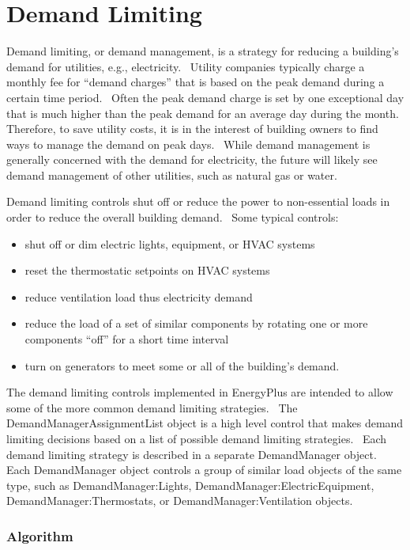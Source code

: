 \chapter{Demand Limiting}\label{demand-limiting}

Demand limiting, or demand management, is a strategy for reducing a building's demand for utilities, e.g., electricity.~ Utility companies typically charge a monthly fee for ``demand charges'' that is based on the peak demand during a certain time period.~ Often the peak demand charge is set by one exceptional day that is much higher than the peak demand for an average day during the month.~ Therefore, to save utility costs, it is in the interest of building owners to find ways to manage the demand on peak days.~ While demand management is generally concerned with the demand for electricity, the future will likely see demand management of other utilities, such as natural gas or water.

Demand limiting controls shut off or reduce the power to non-essential loads in order to reduce the overall building demand.~ Some typical controls:

\begin{itemize}
\item
  shut off or dim electric lights, equipment, or HVAC systems
\item
  reset the thermostatic setpoints on HVAC systems
\item
  reduce ventilation load thus electricity demand
\item
  reduce the load of a set of similar components by rotating one or more components ``off'' for a short time interval
\item
  turn on generators to meet some or all of the building's demand.
\end{itemize}

The demand limiting controls implemented in EnergyPlus are intended to allow some of the more common demand limiting strategies.~ The DemandManagerAssignmentList object is a high level control that makes demand limiting decisions based on a list of possible demand limiting strategies.~ Each demand limiting strategy is described in a separate DemandManager object.~ Each DemandManager object controls a group of similar load objects of the same type, such as DemandManager:Lights, DemandManager:ElectricEquipment, DemandManager:Thermostats, or DemandManager:Ventilation objects.

\subsection{Algorithm}\label{algorithm}

